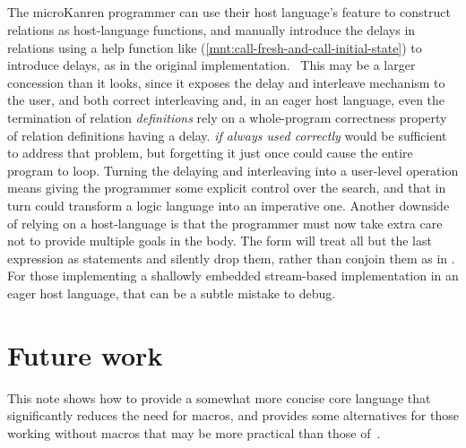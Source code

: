 \documentclass[runningheads,natbib=false]{llncs}
\begin{document}



\subsection{}

The microKanren programmer can use their host language's
 feature to construct relations as host-language
functions, and manually introduce the delays in relations using a help
function like 
(\cref{mnt:call-fresh-and-call-initial-state}) to introduce delays, as
in the original implementation.~\cite{hemann2013muKanren} This may be
a larger concession than it looks, since it exposes the delay and
interleave mechanism to the user, and both correct interleaving and,
in an eager host language, even the termination of relation
\emph{definitions} rely on a whole-program correctness property of
relation definitions having a delay.  \emph{if always
  used correctly} would be sufficient to address that problem, but
forgetting it just once could cause the entire program to loop.
Turning the delaying and interleaving into a user-level operation
means giving the programmer some explicit control over the search, and
that in turn could transform a logic language into an imperative one.
Another downside of relying on a host-language  is
that the programmer must now take extra care not to provide multiple
goals in the body. The  form will treat all but the
last expression as statements and silently drop them, rather than
conjoin them as in . For those implementing a
shallowly embedded stream-based implementation in an eager host
language, that can be a subtle mistake to debug.

\section{Future work}\label{sec:conclusion}

This note shows how to provide a somewhat more concise core language
that significantly reduces the need for macros, and provides some
alternatives for those working without macros that may be more practical
than those of~\citet{hemann2013muKanren}.
\end{document}

